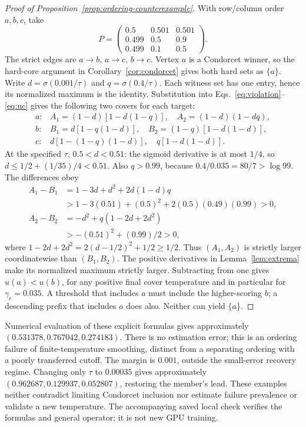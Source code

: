 \begin{proof}[Proof of Proposition~\ref{prop:ordering-counterexample}]
With row/column order $a,b,c$, take
\[
P=\begin{pmatrix}0.5&0.501&0.501\\0.499&0.5&0.9\\0.499&0.1&0.5\end{pmatrix}.
\]
The strict edges are $a\to b$, $a\to c$, $b\to c$. Vertex $a$ is a Condorcet winner, so the hard-core argument in Corollary~\ref{cor:condorcet} gives both hard sets as $\{a\}$.
Write $d=\sigma(0.001/\tau)$ and $q=\sigma(0.4/\tau)$. Each witness set has one entry, hence its normalized maximum is the identity. Substitution into Eqs.~\eqref{eq:violation}--\eqref{eq:uc} gives the following two covers for each target:
\[
\begin{array}{ll}
a:&A_1=(1-d)[1-d(1-q)],\quad A_2=(1-d)(1-dq),\\
b:&B_1=d[1-q(1-d)],\quad B_2=(1-q)[1-d(1-d)],\\
c:&d[1-(1-q)(1-d)],\quad q[1-d(1-d)].
\end{array}
\]
At the specified $\tau$, $0.5<d<0.51$: the sigmoid derivative is at most $1/4$, so $d\le1/2+(1/35)/4<0.51$. Also $q>0.99$, because $0.4/0.035=80/7>\log99$. The differences obey
\[
\begin{split}
A_1-B_1&=1-3d+d^2+2d(1-d)q\\
&>1-3(0.51)+(0.5)^2+2(0.5)(0.49)(0.99)>0,\\
A_2-B_2&=-d^2+q(1-2d+2d^2)\\
&>-(0.51)^2+(0.99)/2>0,
\end{split}
\]
where $1-2d+2d^2=2(d-1/2)^2+1/2\ge1/2$. Thus $(A_1,A_2)$ is strictly larger coordinatewise than $(B_1,B_2)$. The positive derivatives in Lemma~\ref{lem:extrema} make its normalized maximum strictly larger. Subtracting from one gives $u(a)<u(b)$, for any positive final cover temperature and in particular for $\gamma_c=0.035$. A threshold that includes $a$ must include the higher-scoring $b$; a descending prefix that includes $a$ does also. Neither can yield $\{a\}$.
\end{proof}
Numerical evaluation of these explicit formulas gives approximately $(0.531378,0.767042,0.274183)$. There is no estimation error; this is an ordering failure of finite-temperature smoothing, distinct from a separating ordering with a poorly transferred cutoff. The margin is $0.001$, outside the small-error recovery regime. Changing only $\tau$ to $0.00035$ gives approximately $(0.962687,0.129937,0.052807)$, restoring the member's lead. These examples neither contradict limiting Condorcet inclusion nor estimate failure prevalence or validate a new temperature. The accompanying saved local check verifies the formulas and general operator; it is not new GPU training.

